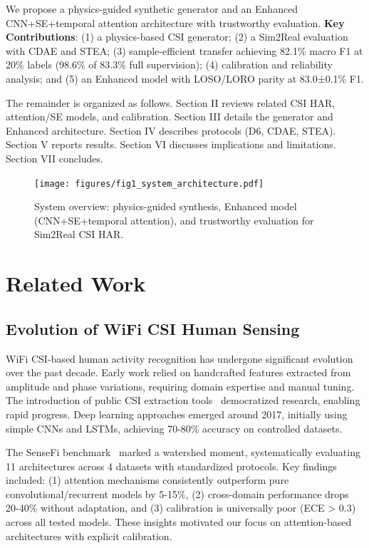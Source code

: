 \documentclass[journal]{IEEEtran}
\begin{document}
We propose a physics-guided synthetic generator and an Enhanced CNN+SE+temporal attention architecture with trustworthy evaluation. \textbf{Key Contributions}: (1) a physics-based CSI generator; (2) a Sim2Real evaluation with CDAE and STEA; (3) sample-efficient transfer achieving 82.1\% macro F1 at 20\% labels (98.6\% of 83.3\% full supervision); (4) calibration and reliability analysis; and (5) an Enhanced model with LOSO/LORO parity at 83.0±0.1\% F1.

The remainder is organized as follows. Section II reviews related CSI HAR, attention/SE models, and calibration. Section III details the generator and Enhanced architecture. Section IV describes protocols (D6, CDAE, STEA). Section V reports results. Section VI discusses implications and limitations. Section VII concludes.

\begin{figure}[t]
\centering
\texttt{[image: figures/fig1\_system\_architecture.pdf]}
\caption{System overview: physics-guided synthesis, Enhanced model (CNN+SE+temporal attention), and trustworthy evaluation for Sim2Real CSI HAR.}
\label{fig:overview}
\end{figure}

\section{Related Work}
\subsection{Evolution of WiFi CSI Human Sensing}
WiFi CSI-based human activity recognition has undergone significant evolution over the past decade. Early work relied on handcrafted features extracted from amplitude and phase variations, requiring domain expertise and manual tuning. The introduction of public CSI extraction tools~\cite{csi_tool2011} democratized research, enabling rapid progress. Deep learning approaches emerged around 2017, initially using simple CNNs and LSTMs, achieving 70-80\% accuracy on controlled datasets.

The SenseFi benchmark~\cite{yang2023sensefi} marked a watershed moment, systematically evaluating 11 architectures across 4 datasets with standardized protocols. Key findings included: (1) attention mechanisms consistently outperform pure convolutional/recurrent models by 5-15\%, (2) cross-domain performance drops 20-40\% without adaptation, and (3) calibration is universally poor (ECE > 0.3) across all tested models. These insights motivated our focus on attention-based architectures with explicit calibration.
\end{document}
